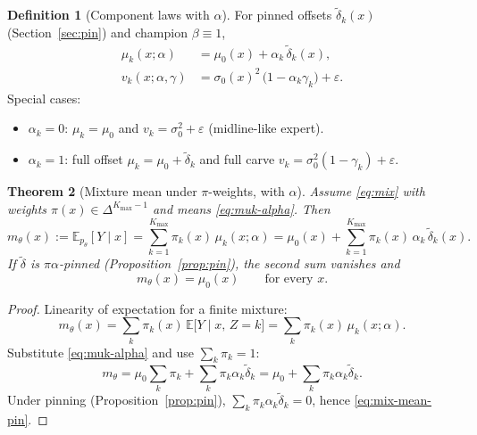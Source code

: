 \documentclass[11pt,a4paper]{article}
\theoremstyle{plain}
\newtheorem{theorem}{Theorem}[section]
\theoremstyle{definition}
\newtheorem{definition}[theorem]{Definition}
\theoremstyle{remark}
\newcommand{\E}{\mathbb{E}}
\newcommand{\tht}{\theta}
\newcommand{\Kmax}{K_{\max}}
\newcommand{\simplex}{\Delta}
\begin{document}
\begin{definition}[Component laws with \(\alpha\)]
For pinned offsets \(\tilde\delta_k(x)\) (Section~\ref{sec:pin}) and champion
\(\beta\equiv 1\),
\begin{align}
  \mu_k(x;\alpha)
  &=
  \mu_0(x)
  +
  \alpha_k\,\tilde\delta_k(x),
  \label{eq:muk-alpha}
  \\
  v_k(x;\alpha,\gamma)
  &=
  \sigma_0(x)^2\,
  \bigl(1-\alpha_k\gamma_k\bigr)
  +
  \varepsilon.
  \label{eq:vark-alpha}
\end{align}
Special cases:
\begin{itemize}[leftmargin=1.2em]
  \item \(\alpha_k=0\): \(\mu_k=\mu_0\) and \(v_k=\sigma_0^2+\varepsilon\) (midline-like expert).
  \item \(\alpha_k=1\): full offset \(\mu_k=\mu_0+\tilde\delta_k\) and full carve
        \(v_k=\sigma_0^2(1-\gamma_k)+\varepsilon\).
\end{itemize}
\end{definition}

\begin{theorem}[Mixture mean under \(\pi\)-weights, with \(\alpha\)]
\label{thm:mix-mean}
Assume \eqref{eq:mix} with weights \(\pi(x)\in\simplex^{\Kmax-1}\) and means
\eqref{eq:muk-alpha}. Then
\begin{equation}
  m_\tht(x)
  :=
  \E_{p_\tht}[Y\mid x]
  =
  \sum_{k=1}^{\Kmax}
  \pi_k(x)\,
  \mu_k(x;\alpha)
  =
  \mu_0(x)
  +
  \sum_{k=1}^{\Kmax}
  \pi_k(x)\,
  \alpha_k\,
  \tilde\delta_k(x).
  \label{eq:mix-mean-expanded}
\end{equation}
If \(\tilde\delta\) is \(\pi\alpha\)-pinned (Proposition~\ref{prop:pin}), the second
sum vanishes and
\begin{equation}
  \boxed{
  m_\tht(x)=\mu_0(x)
  }
  \qquad\text{for every }x.
  \label{eq:mix-mean-pin}
\end{equation}
\end{theorem}

\begin{proof}
Linearity of expectation for a finite mixture:
\[
  m_\tht(x)
  =
  \sum_k\pi_k(x)\,
  \E\bigl[Y\mid x,\,Z=k\bigr]
  =
  \sum_k\pi_k(x)\,\mu_k(x;\alpha).
\]
Substitute \eqref{eq:muk-alpha} and use \(\sum_k\pi_k=1\):
\[
  m_\tht
  =
  \mu_0\sum_k\pi_k
  +
  \sum_k\pi_k\alpha_k\tilde\delta_k
  =
  \mu_0
  +
  \sum_k\pi_k\alpha_k\tilde\delta_k.
\]
Under pinning (Proposition~\ref{prop:pin}), \(\sum_k\pi_k\alpha_k\tilde\delta_k=0\),
hence \eqref{eq:mix-mean-pin}.
\end{proof}
\end{document}
